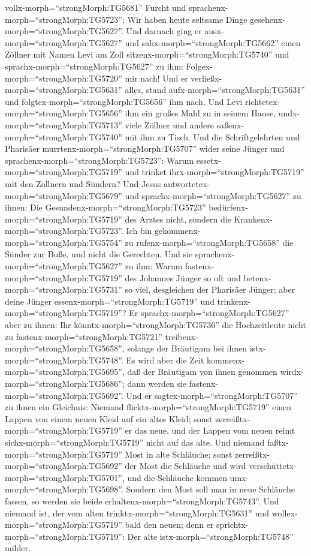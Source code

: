 vollx-morph=``strongMorph:TG5681'' Furcht und
sprachenx-morph=``strongMorph:TG5723'': Wir haben heute seltsame Dinge
gesehenx-morph=``strongMorph:TG5627''.  Und darnach ging er
ausx-morph=``strongMorph:TG5627'' und sahx-morph=``strongMorph:TG5662''
einen Zöllner mit Namen Levi am Zoll
sitzenx-morph=``strongMorph:TG5740'' und
sprachx-morph=``strongMorph:TG5627'' zu ihm:
Folgex-morph=``strongMorph:TG5720'' mir nach!  Und er
verließx-morph=``strongMorph:TG5631'' alles, stand
aufx-morph=``strongMorph:TG5631'' und
folgtex-morph=``strongMorph:TG5656'' ihm nach.  Und Levi
richtetex-morph=``strongMorph:TG5656'' ihm ein großes Mahl zu in seinem
Hause, undx-morph=``strongMorph:TG5713'' viele Zöllner und andere
saßenx-morph=``strongMorph:TG5740'' mit ihm zu Tisch.  Und
die Schriftgelehrten und Pharisäer murrtenx-morph=``strongMorph:TG5707''
wider seine Jünger und sprachenx-morph=``strongMorph:TG5723'': Warum
essetx-morph=``strongMorph:TG5719'' und trinket
ihrx-morph=``strongMorph:TG5719'' mit den Zöllnern und Sündern?
 Und Jesus antwortetex-morph=``strongMorph:TG5679'' und
sprachx-morph=``strongMorph:TG5627'' zu ihnen: Die
Gesundenx-morph=``strongMorph:TG5723''
bedürfenx-morph=``strongMorph:TG5719'' des Arztes nicht, sondern die
Krankenx-morph=``strongMorph:TG5723''.  Ich bin
gekommenx-morph=``strongMorph:TG5754'' zu
rufenx-morph=``strongMorph:TG5658'' die Sünder zur Buße, und nicht die
Gerechten.  Und sie sprachenx-morph=``strongMorph:TG5627''
zu ihm: Warum fastenx-morph=``strongMorph:TG5719'' des Johannes Jünger
so oft und betenx-morph=``strongMorph:TG5731'' so viel, desgleichen der
Pharisäer Jünger; aber deine Jünger essenx-morph=``strongMorph:TG5719''
und trinkenx-morph=``strongMorph:TG5719''?  Er
sprachx-morph=``strongMorph:TG5627'' aber zu ihnen: Ihr
könntx-morph=``strongMorph:TG5736'' die Hochzeitleute nicht zu
fastenx-morph=``strongMorph:TG5721''
treibenx-morph=``strongMorph:TG5658'', solange der Bräutigam bei ihnen
istx-morph=``strongMorph:TG5748''.  Es wird aber die Zeit
kommenx-morph=``strongMorph:TG5695'', daß der Bräutigam von ihnen
genommen wirdx-morph=``strongMorph:TG5686''; dann werden sie
fastenx-morph=``strongMorph:TG5692''.  Und er
sagtex-morph=``strongMorph:TG5707'' zu ihnen ein Gleichnis: Niemand
flicktx-morph=``strongMorph:TG5719'' einen Lappen von einem neuen Kleid
auf ein altes Kleid; sonst zerreißtx-morph=``strongMorph:TG5719'' er das
neue, und der Lappen vom neuen reimt sichx-morph=``strongMorph:TG5719''
nicht auf das alte.  Und niemand
faßtx-morph=``strongMorph:TG5719'' Most in alte Schläuche; sonst
zerreißtx-morph=``strongMorph:TG5692'' der Most die Schläuche und wird
verschüttetx-morph=``strongMorph:TG5701'', und die Schläuche kommen
umx-morph=``strongMorph:TG5698''.  Sondern den Most soll
man in neue Schläuche fassen, so werden sie beide
erhaltenx-morph=``strongMorph:TG5743''.  Und niemand ist,
der vom alten trinktx-morph=``strongMorph:TG5631'' und
wollex-morph=``strongMorph:TG5719'' bald den neuen; denn er
sprichtx-morph=``strongMorph:TG5719'': Der alte
istx-morph=``strongMorph:TG5748'' milder.


